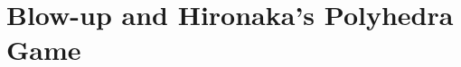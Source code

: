 \documentclass[12pt]{article}
\theoremstyle{definition}
\theoremstyle{plain}
\newcommand{\dif}{\mathrm{d}} %
\begin{document}






\section{Blow-up and Hironaka's Polyhedra Game}

\end{document}
